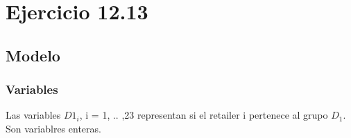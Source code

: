 \section{Ejercicio 12.13}
\subsection{Modelo}
\subsubsection{Variables}
Las variables ${D1}_i$, i = 1, .. ,23 representan si el retailer i pertenece al grupo ${D}_1$. Son variablres enteras. \\




